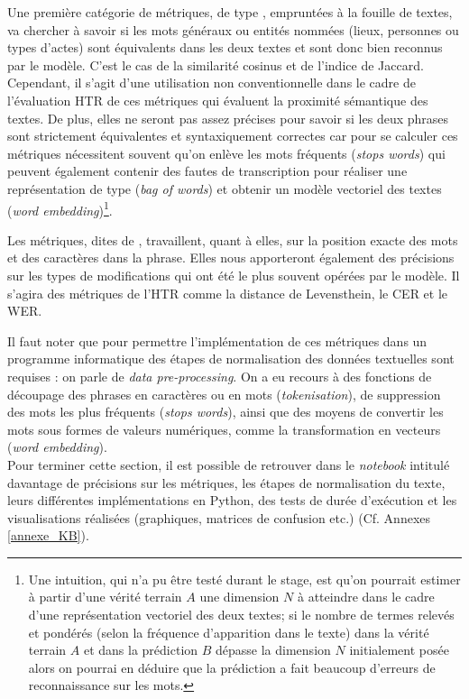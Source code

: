 Une première catégorie de métriques, de type , empruntées à la fouille de textes, va chercher à savoir si les mots généraux ou entités nommées (lieux, personnes ou types d'actes) sont équivalents dans les deux textes et sont donc bien reconnus par le modèle. C'est le cas de la similarité cosinus et de l'indice de Jaccard. Cependant, il s'agit d'une utilisation non conventionnelle dans le cadre de l'évaluation HTR de ces métriques qui évaluent la proximité sémantique des textes. De plus, elles ne seront pas assez précises pour savoir si les deux phrases sont strictement équivalentes et syntaxiquement correctes car pour se calculer ces métriques nécessitent souvent qu'on enlève les mots fréquents (\textit{stops words}) qui peuvent également contenir des fautes de transcription pour réaliser une représentation de type  (\textit{bag of words}) et obtenir un modèle vectoriel des textes (\textit{word embedding})\footnote{Une intuition, qui n'a pu être testé durant le stage, est qu'on pourrait estimer à partir d'une vérité terrain $A$ une dimension $N$ à atteindre dans le cadre d'une représentation vectoriel des deux textes; si le nombre de termes relevés et pondérés (selon la fréquence d'apparition dans le texte) dans la vérité terrain $A$ et dans la prédiction $B$ dépasse la dimension $N$ initialement posée alors on pourrai en déduire que la prédiction a fait beaucoup d'erreurs de reconnaissance sur les mots.}.

Les métriques, dites de , travaillent, quant à elles, sur la position exacte des mots et des caractères dans la phrase. Elles nous apporteront également des précisions sur les types de modifications qui ont été le plus souvent opérées par le modèle. Il s'agira des métriques  de l'HTR comme la distance de Levensthein, le CER et le WER.

Il faut noter que pour permettre l'implémentation de ces métriques dans un programme informatique des étapes de normalisation des données textuelles sont requises : on parle de \textit{data pre-processing}. On a eu recours à des fonctions de découpage des phrases en caractères ou en mots (\textit{tokenisation}), de suppression des mots les plus fréquents (\textit{stops words}), ainsi que des moyens de convertir les mots sous formes de valeurs numériques, comme la transformation en vecteurs (\textit{word embedding}).\\

Pour terminer cette section, il est possible de retrouver dans le \textit{notebook} intitulé  davantage de précisions sur les métriques, les étapes de normalisation du texte, leurs différentes implémentations en Python, des tests de durée d'exécution et les visualisations réalisées (graphiques, matrices de confusion etc.) (Cf. Annexes \ref{annexe_KB}).\\
\clearpage
\thispagestyle{empty}
